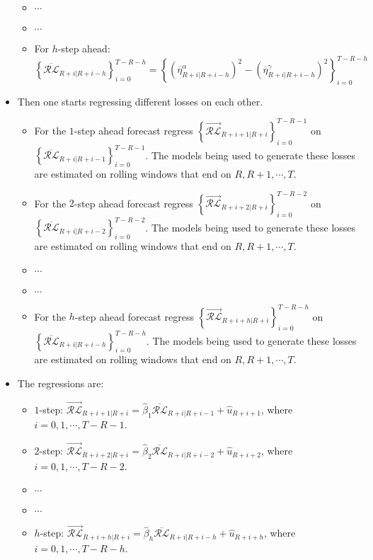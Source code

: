 \documentclass[11pt]{article}
\begin{document}
\begin{itemize}
\begin{itemize}
\item $\cdots$
\item $\cdots$
\item For $h$-step ahead: $\left\{\overline{\mathcal{RL}}_{R+i|R+i-h}\right\}_{i=0}^{T-R-h}\!\!\!\!=\left\{\left(\overline{\eta}^{\alpha}_{R+i|R+i-h}\right)^{2}\!\!-\left(\overline{\eta}^{\gamma}_{R+i|R+i-h}\right)^{2}\right\}_{i=0}^{T-R-h}$
\end{itemize}
\item Then one starts regressing different losses on each other.
\begin{itemize}
\item For the $1$-step ahead forecast regress $\left\{\overrightarrow{\mathcal{RL}}_{R+i+1|R+i}\right\}_{i=0}^{T-R-1}$ on $\left\{\overline{\mathcal{RL}}_{R+i|R+i-1}\right\}_{i=0}^{T-R-1}$.  The models being used to generate these losses are estimated on rolling windows that end on $R, R+1, \cdots, T$.
\item For the $2$-step ahead forecast regress $\left\{\overrightarrow{\mathcal{RL}}_{R+i+2|R+i}\right\}_{i=0}^{T-R-2}$ on $\left\{\overline{\mathcal{RL}}_{R+i|R+i-2}\right\}_{i=0}^{T-R-2}$.  The models being used to generate these losses are estimated on rolling windows that end on $R, R+1, \cdots, T$.
\item $\cdots$
\item $\cdots$
\item For the $h$-step ahead forecast regress $\left\{\overrightarrow{\mathcal{RL}}_{R+i+h|R+i}\right\}_{i=0}^{T-R-h}$ on $\left\{\overline{\mathcal{RL}}_{R+i|R+i-h}\right\}_{i=0}^{T-R-h}$.  The models being used to generate these losses are estimated on rolling windows that end on $R, R+1, \cdots, T$.
\end{itemize}
\item The regressions are:
\begin{itemize}
\item $1$-step: $\overrightarrow{\mathcal{RL}}_{R+i+1|R+i}=\widehat{\beta}_{1}\overline{\mathcal{RL}}_{R+i|R+i-1}+\widehat{u}_{R+i+1}$, where $i=0, 1, \cdots, T-R-1$.
\item $2$-step: $\overrightarrow{\mathcal{RL}}_{R+i+2|R+i}=\widehat{\beta}_{2}\overline{\mathcal{RL}}_{R+i|R+i-2}+\widehat{u}_{R+i+2}$, where $i=0, 1, \cdots, T-R-2$.
\item $\cdots$
\item $\cdots$
\item $h$-step: $\overrightarrow{\mathcal{RL}}_{R+i+h|R+i}=\widehat{\beta}_{h}\overline{\mathcal{RL}}_{R+i|R+i-h}+\widehat{u}_{R+i+h}$, where $i=0, 1, \cdots, T-R-h$.

\end{itemize}
\end{itemize}
\end{document}
